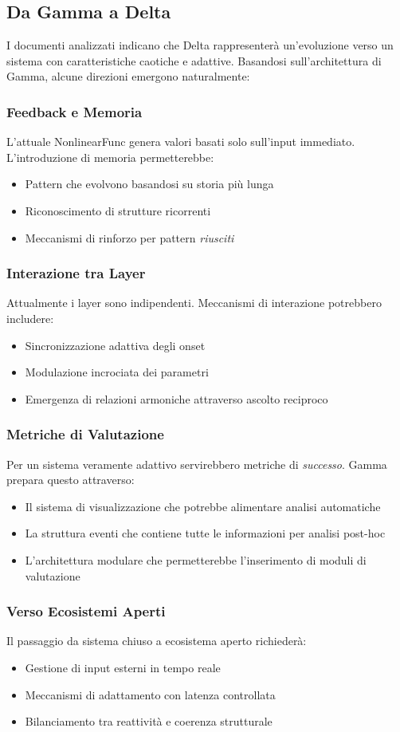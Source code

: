 \subsection{Da Gamma a Delta}
I documenti analizzati indicano che Delta rappresenterà un'evoluzione verso un sistema con caratteristiche caotiche e adattive. Basandosi sull'architettura di Gamma, alcune direzioni emergono naturalmente:
\subsubsection{Feedback e Memoria}
L'attuale NonlinearFunc genera valori basati solo sull'input immediato. L'introduzione di memoria permetterebbe:
\begin{itemize}
    \item Pattern che evolvono basandosi su storia più lunga
    \item Riconoscimento di strutture ricorrenti
    \item Meccanismi di rinforzo per pattern \textit{riusciti}
\end{itemize}
\subsubsection{Interazione tra Layer}
Attualmente i layer sono indipendenti. Meccanismi di interazione potrebbero includere:
\begin{itemize}
    \item Sincronizzazione adattiva degli onset
    \item Modulazione incrociata dei parametri
    \item Emergenza di relazioni armoniche attraverso ascolto reciproco
\end{itemize}
\subsubsection{Metriche di Valutazione}
Per un sistema veramente adattivo servirebbero metriche di \textit{successo}. Gamma prepara questo attraverso:
\begin{itemize}
    \item Il sistema di visualizzazione che potrebbe alimentare analisi automatiche
    \item La struttura eventi che contiene tutte le informazioni per analisi post-hoc
    \item L'architettura modulare che permetterebbe l'inserimento di moduli di valutazione
\end{itemize}
\subsubsection{Verso Ecosistemi Aperti}
Il passaggio da sistema chiuso a ecosistema aperto richiederà:
\begin{itemize}
    \item Gestione di input esterni in tempo reale
    \item Meccanismi di adattamento con latenza controllata
    \item Bilanciamento tra reattività e coerenza strutturale
\end{itemize}

